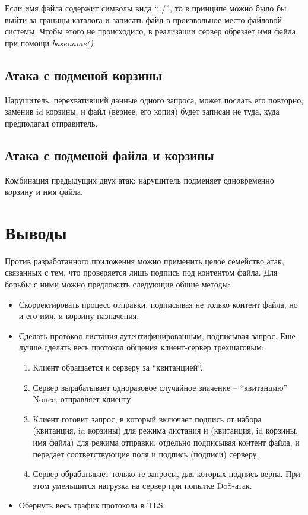 \documentclass[a4paper,12pt]{article}
\begin{document}
Если имя файла содержит символы вида ``../'', то в принципе можно было бы выйти за границы каталога и записать файл 
в произвольное место файловой системы. Чтобы этого не происходило, в реализации сервер обрезает имя файла при помощи \emph{basename()}.
 
\subsection{Атака с подменой корзины}

Нарушитель, перехвативший данные одного запроса, может послать его повторно, заменив id корзины, и файл (вернее, его копия) 
будет записан не туда,
куда предполагал отправитель. 

\subsection{Атака с подменой файла и корзины}

Комбинация предыдущих двух атак: нарушитель подменяет одновременно корзину и имя файла.

\section*{Выводы}

Против разработанного приложения можно применить целое семейство атак, связанных с тем, что проверяется лишь подпись под контентом файла.
Для борьбы с ними можно предложить следующие общие методы:
\begin{itemize}
\item Скорректировать процесс отправки, подписывая не только контент файла, но и его имя, и корзину назначения.
 \item Сделать протокол листания аутентифицированным, подписывая запрос. Еще лучше сделать весь протокол общения клиент-сервер трехшаговым:
 \begin{enumerate}
 \item Клиент обращается к серверу за ``квитанцией''.
  \item Сервер вырабатывает одноразовое случайное значение -- ``квитанцию'' Nonce, отправляет клиенту.
  \item Клиент готовит запрос, в который включает подпись от набора (квитанция, id корзины) для режима листания и
  (квитанция, id корзины, имя файла) для режима отправки, отдельно подписывая контент файла, и передает соответствующие поля и подпись (подписи) серверу. 
  \item Сервер обрабатывает только те запросы, для которых подпись верна. При этом уменьшится нагрузка на сервер при попытке DoS-атак.
 \end{enumerate}
\item Обернуть весь трафик протокола в TLS.
 \end{itemize}
\end{document}
